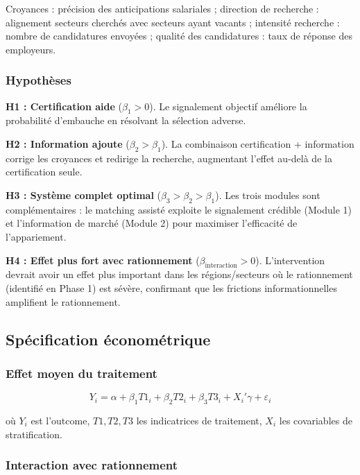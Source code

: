 \documentclass[12pt,a4paper]{article}
\begin{document}
Croyances : précision des anticipations salariales ; direction de recherche : alignement secteurs cherchés avec secteurs ayant vacants ; intensité recherche : nombre de candidatures envoyées ; qualité des candidatures : taux de réponse des employeurs.

\subsubsection{Hypothèses}

\textbf{H1 : Certification aide} ($\beta_1 > 0$). Le signalement objectif améliore la probabilité d'embauche en résolvant la sélection adverse.

\textbf{H2 : Information ajoute} ($\beta_2 > \beta_1$). La combinaison certification + information corrige les croyances et redirige la recherche, augmentant l'effet au-delà de la certification seule.

\textbf{H3 : Système complet optimal} ($\beta_3 > \beta_2 > \beta_1$). Les trois modules sont complémentaires : le matching assisté exploite le signalement crédible (Module 1) et l'information de marché (Module 2) pour maximiser l'efficacité de l'appariement.

\textbf{H4 : Effet plus fort avec rationnement} ($\beta_{\text{interaction}} > 0$). L'intervention devrait avoir un effet plus important dans les régions/secteurs où le rationnement (identifié en Phase 1) est sévère, confirmant que les frictions informationnelles amplifient le rationnement.

\subsection{Spécification économétrique}

\subsubsection{Effet moyen du traitement}

\begin{equation}
Y_i = \alpha + \beta_1 T1_i + \beta_2 T2_i + \beta_3 T3_i + X_i'\gamma + \varepsilon_i
\end{equation}

où $Y_i$ est l'outcome, $T1, T2, T3$ les indicatrices de traitement, $X_i$ les covariables de stratification.

\subsubsection{Interaction avec rationnement}
\end{document}
